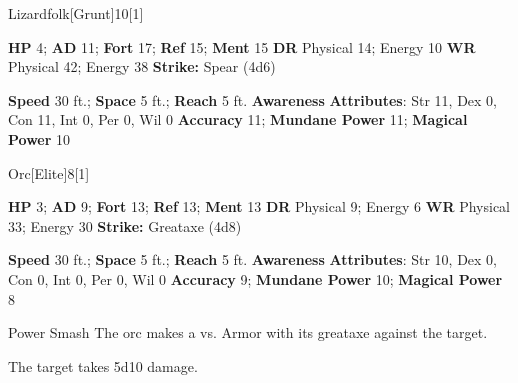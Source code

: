   
  \begin{monsection}{Lizardfolk}[Grunt]{10}[1]
    \vspace{-1em}\vspace{-1em}
    \begin{spellcontent}
      \begin{spelltargetinginfo}
        \pari \textbf{HP} 4;
          \textbf{AD} 11;
          \textbf{Fort} 17;
          \textbf{Ref} 15;
          \textbf{Ment} 15
        \pari \textbf{DR} Physical 14; Energy 10
        \pari \textbf{WR} Physical 42; Energy 38
        \pari \textbf{Strike:}
            Spear  (4d6)
      \end{spelltargetinginfo}
    \end{spellcontent}
    \begin{monsterfooter}
      \pari \textbf{Speed} 30 ft.;
        \textbf{Space} 5 ft.;
        \textbf{Reach} 5 ft.
      \pari \textbf{Awareness} 
      \pari \textbf{Attributes}:
        Str 11, Dex 0, Con 11,
        Int 0, Per 0, Wil 0
      \pari \textbf{Accuracy} 11;
        \textbf{Mundane Power} 11;
      \textbf{Magical Power} 10
    \end{monsterfooter}
  \end{monsection}
  
  
  \begin{monsection}{Orc}[Elite]{8}[1]
    \vspace{-1em}\vspace{-1em}
    \begin{spellcontent}
      \begin{spelltargetinginfo}
        \pari \textbf{HP} 3;
          \textbf{AD} 9;
          \textbf{Fort} 13;
          \textbf{Ref} 13;
          \textbf{Ment} 13
        \pari \textbf{DR} Physical 9; Energy 6
        \pari \textbf{WR} Physical 33; Energy 30
        \pari \textbf{Strike:}
            Greataxe  (4d8)
      \end{spelltargetinginfo}
    \end{spellcontent}
    \begin{monsterfooter}
      \pari \textbf{Speed} 30 ft.;
        \textbf{Space} 5 ft.;
        \textbf{Reach} 5 ft.
      \pari \textbf{Awareness} 
      \pari \textbf{Attributes}:
        Str 10, Dex 0, Con 0,
        Int 0, Per 0, Wil 0
      \pari \textbf{Accuracy} 9;
        \textbf{Mundane Power} 10;
      \textbf{Magical Power} 8
    \end{monsterfooter}
  \end{monsection}
  \begin{freeability}{Power Smash}
      The orc makes a 
         vs. Armor
        with its greataxe against the target.
    
    \hit The target takes 5d10  damage.
    \end{freeability}
  
